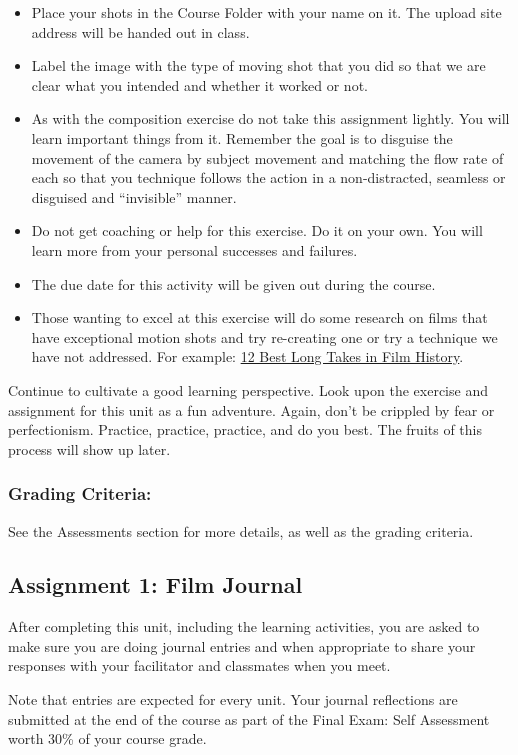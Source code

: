 \documentclass[
]{book}
\begin{document}
\begin{assessment}
\begin{itemize}
\item
  Place your shots in the Course Folder with your name on it. The upload site address will be handed out in class.
\item
  Label the image with the type of moving shot that you did so that we are clear what you intended and whether it worked or not.
\item
  As with the composition exercise do not take this assignment lightly. You will learn important things from it. Remember the goal is to disguise the movement of the camera by subject movement and matching the flow rate of each so that you technique follows the action in a non-distracted, seamless or disguised and ``invisible'' manner.
\item
  Do not get coaching or help for this exercise. Do it on your own. You will learn more from your personal successes and failures.
\item
  The due date for this activity will be given out during the course.
\item
  Those wanting to excel at this exercise will do some research on films that have exceptional motion shots and try re-creating one or try a technique we have not addressed. For example: \href{https://www.youtube.com/watch?v=oLFHdagIw6o\&t=61s}{12 Best Long Takes in Film History}.
\end{itemize}

Continue to cultivate a good learning perspective. Look upon the exercise and assignment for this unit as a fun adventure. Again, don't be crippled by fear or perfectionism. Practice, practice, practice, and do you best. The fruits of this process will show up later.

\hypertarget{grading-criteria-3}{%
\subsubsection*{Grading Criteria:}\label{grading-criteria-3}}

See the Assessments section for more details, as well as the grading criteria.

\hypertarget{assignment-1-film-journal-1}{%
\subsection*{Assignment 1: Film Journal}\label{assignment-1-film-journal-1}}

After completing this unit, including the learning activities, you are asked to make sure you are doing journal entries and when appropriate to share your responses with your facilitator and classmates when you meet.

Note that entries are expected for every unit. Your journal reflections are submitted at the end of the course as part of the Final Exam: Self Assessment worth 30\% of your course grade.
\end{assessment}
\end{document}
